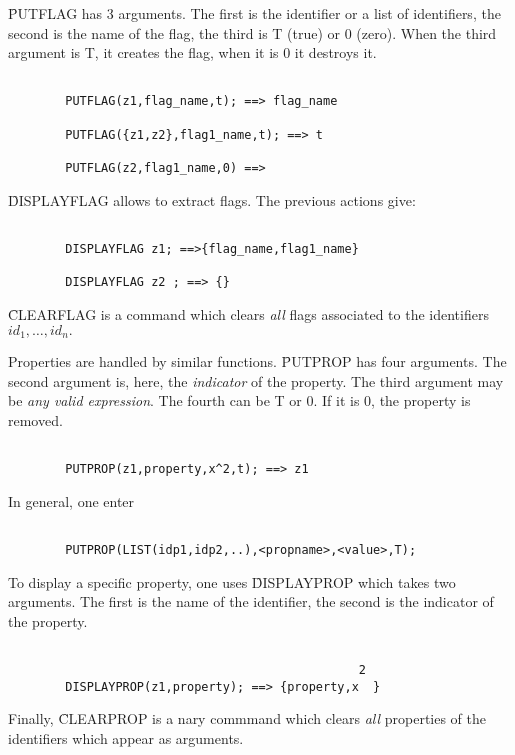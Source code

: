 \f{PUTFLAG} has 3 arguments. The first is the identifier or a list
of identifiers, the second is the name of the flag,
the third is T (true) or 0 (zero).
When the third argument is T, it creates the flag, when it is 0 it
destroys it.
\begin{verbatim}

        PUTFLAG(z1,flag_name,t); ==> flag_name

        PUTFLAG({z1,z2},flag1_name,t); ==> t

        PUTFLAG(z2,flag1_name,0) ==>

\end{verbatim}
\f{DISPLAYFLAG} allows to extract flags. The previous actions give:
\begin{verbatim}

        DISPLAYFLAG z1; ==>{flag_name,flag1_name}

        DISPLAYFLAG z2 ; ==> {}

\end{verbatim}
\f{CLEARFLAG} is a command which clears {\em all} flags associated to
the identifiers $id_1, \ldots , id_n .$
\item[ii.] Properties are handled by similar functions.
\f{PUTPROP} has four arguments. The second argument is, here, the
{\em indicator} of the property. The third argument may be {\em any
valid expression}. The fourth can be T or 0.  If it is 0, the property
is removed.
\begin{verbatim}

        PUTPROP(z1,property,x^2,t); ==> z1

\end{verbatim}
In general, one enter
\begin{verbatim}

        PUTPROP(LIST(idp1,idp2,..),<propname>,<value>,T);

\end{verbatim}
To display a specific property, one uses
\f{DISPLAYPROP} which takes two arguments. The first is the name of the
identifier, the second is the indicator of the property.
\begin{verbatim}

                                                 2
        DISPLAYPROP(z1,property); ==> {property,x  }

\end{verbatim}
Finally, \f{CLEARPROP} is a nary commmand which clears {\em all}
properties of the identifiers which appear as arguments.
\ei
